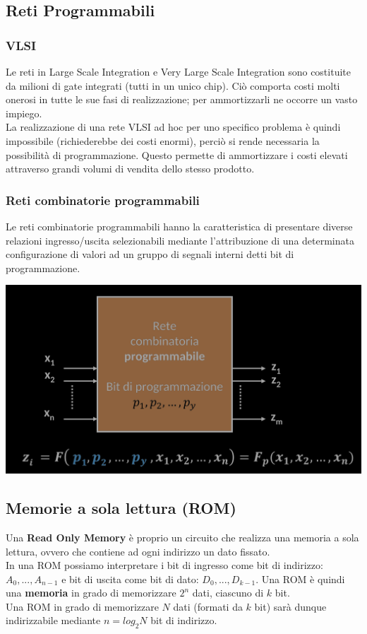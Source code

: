 \documentclass{article}
\begin{document}
\subsection{Reti Programmabili}
\subsubsection{VLSI}
Le reti in Large Scale Integration e Very Large Scale Integration sono costituite da milioni di gate integrati (tutti in un unico chip). Ciò comporta costi molti onerosi in tutte le sue fasi di realizzazione; per ammortizzarli ne occorre un vasto impiego.
\vspace{0.2cm}\\
La realizzazione di una rete VLSI ad hoc per uno specifico problema è quindi impossibile (richiederebbe dei costi enormi), perciò si rende necessaria la possibilità di programmazione. Questo permette di ammortizzare i costi elevati attraverso grandi volumi di vendita dello stesso prodotto.
\subsubsection{Reti combinatorie programmabili}
Le reti combinatorie programmabili hanno la caratteristica di presentare diverse relazioni ingresso/uscita selezionabili mediante l’attribuzione di una determinata configurazione di valori ad un gruppo di segnali interni detti bit di programmazione.
\begin{center}
    \includegraphics[scale=0.5]{retiProg1.png}
\end{center}


\subsection{Memorie a sola lettura (ROM)}
Una \textbf{\color{cyan} Read Only Memory} è proprio un circuito che realizza una memoria a sola lettura, ovvero che contiene ad ogni indirizzo un dato fissato.
\\
In una ROM possiamo interpretare i bit di ingresso come bit di indirizzo: $A_0,...,A_{n-1}$ e bit di uscita come bit di dato: $D_0,...,D_{k-1}$. Una ROM è quindi una \textbf{memoria} in grado di memorizzare $2^n$ dati, ciascuno di $k$ bit.\\
Una ROM in grado di memorizzare $N$ dati (formati da $k$ bit) sarà dunque indirizzabile mediante $n = log_2 N$ bit di indirizzo.
\end{document}

